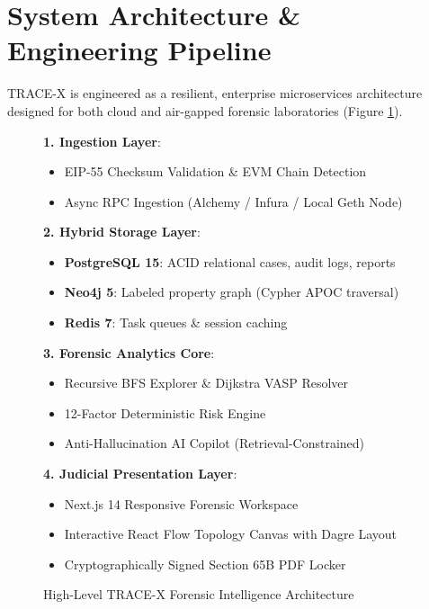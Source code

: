 \documentclass[10pt,twocolumn,a4paper]{article}
\begin{document}
\section{System Architecture \& Engineering Pipeline}
TRACE-X is engineered as a resilient, enterprise microservices architecture designed for both cloud and air-gapped forensic laboratories (Figure \ref{fig:arch}).

\begin{figure}[h]
\centering
\begin{tcolorbox}[colback=white,colframe=darkslate,arc=2mm,boxrule=0.6pt,title=\textbf{TRACE-X Data Pipeline Architecture}]
\small
\textbf{1. Ingestion Layer}:
\begin{itemize}[leftmargin=*]
    \item EIP-55 Checksum Validation \& EVM Chain Detection
    \item Async RPC Ingestion (Alchemy / Infura / Local Geth Node)
\end{itemize}
\vspace{1mm}
\textbf{2. Hybrid Storage Layer}:
\begin{itemize}[leftmargin=*]
    \item \textbf{PostgreSQL 15}: ACID relational cases, audit logs, reports
    \item \textbf{Neo4j 5}: Labeled property graph (Cypher APOC traversal)
    \item \textbf{Redis 7}: Task queues \& session caching
\end{itemize}
\vspace{1mm}
\textbf{3. Forensic Analytics Core}:
\begin{itemize}[leftmargin=*]
    \item Recursive BFS Explorer \& Dijkstra VASP Resolver
    \item 12-Factor Deterministic Risk Engine
    \item Anti-Hallucination AI Copilot (Retrieval-Constrained)
\end{itemize}
\vspace{1mm}
\textbf{4. Judicial Presentation Layer}:
\begin{itemize}[leftmargin=*]
    \item Next.js 14 Responsive Forensic Workspace
    \item Interactive React Flow Topology Canvas with Dagre Layout
    \item Cryptographically Signed Section 65B PDF Locker
\end{itemize}
\end{tcolorbox}
\caption{High-Level TRACE-X Forensic Intelligence Architecture}
\label{fig:arch}
\end{figure}
\end{document}
